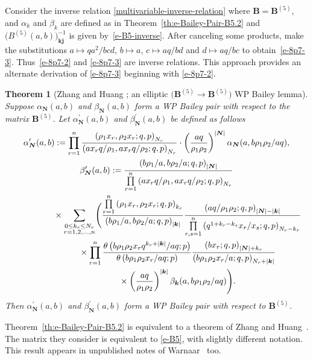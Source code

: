 \documentclass[pdftex]{sigma}
\numberwithin{equation}{section}
\newtheorem{Theorem}{Theorem}[section]
\newenvironment{Remark*}{\begin{remark*}\normalfont}{\end{remark*}}
\newcommand{\sumN}{{\left| \boldsymbol{N} \right|}}
\newcommand\sumk{{\left| \boldsymbol{k} \right|}}
\newcommand{\B}{{ \mathbf B}}
\newcommand{\N}{{ \boldsymbol N}}
\renewcommand{\k}{{ \boldsymbol{k}}}
\renewcommand{\j}{{ \boldsymbol{j}}}
\newcommand{\multsum}[3]{{\sum\limits_{\substack{{0\le #1_#3 \le #2_#3} \\
{#3 =1,2,\dots, n}}}}}
\newcommand{\sqprod}[1]{\prod\limits_{r, s =1}^{#1}} %
\newcommand{\smallprod}[1]{\prod\limits_{r =1}^{#1}} %
\newcommand{\xover}[1]{#1_{r}/#1_{s}}
\newcommand{\ellipticqrfac}[2]{{\left({#1}; q, p\right)_{#2}}} %
\newcommand{\elliptictheta}[1]{\theta \left({#1} ; p\right) }
\begin{document}
Consider the inverse relation \eqref{multivariable-inverse-relation} where $\B=\B^{(5)}$, and $\alpha_k$ and $\beta_k$ are defined as in Theorem~\ref{th:e-Bailey-Pair-B5.2} and $\big(B^{(5)}(a,b)\big)^{-1}_{\k\j} $ is given by~\eqref{e-B5-inverse}. After canceling some products, make the substitutions $a\mapsto qa^2/bcd$, $b\mapsto a$, $c\mapsto aq/bd$ and $d\mapsto aq/bc$ to obtain~\eqref{e-8p7-3}. Thus~\eqref{e-8p7-2} and \eqref{e-8p7-3} are inverse relations. This approach provides an alternate derivation of \eqref{e-8p7-3} beginning with \eqref{e-8p7-2}.

\begin{Theorem}[Zhang and Huang \cite{ZH-preprint}; an elliptic $\big(\B^{(5)} \to\B^{(5)}\big)$ WP Bailey lemma] \label{th:e-WP-BaileyLemma-B5-B5}
Suppose $\alpha_\N(a,b)$ and $\beta_\N(a,b)$ form a WP Bailey pair with respect to the matrix $\B^{(5)}$. Let ${\alpha}^{\prime}_\N(a,b)$ and ${\beta}^{\prime}_\N(a,b)$ be defined as follows
\begin{gather*}
{\alpha}^{\prime}_\N(a,b) :=
 \smallprod n \frac{ \ellipticqrfac{\rho_1x_r, \rho_2x_r}{N_r}}
{\ellipticqrfac{ax_rq/\rho_1, ax_rq/\rho_2}{N_r}}
\cdot \left(\frac{aq}{\rho_1\rho_2}\right)^{\sumN}
 \alpha_\N(a, b\rho_1\rho_2/aq),\\
{\beta}^{\prime}_\N (a,b) :=
\frac{\ellipticqrfac{b\rho_1/a, b\rho_2/a }{\sumN}}
{\smallprod n \ellipticqrfac{ax_rq/\rho_1, ax_rq/\rho_2}{N_r}}\\
\hphantom{{\beta}^{\prime}_\N (a,b) :=}{} \times \multsum{k}{N}{r} \Bigg( \frac{ \smallprod n \ellipticqrfac{\rho_1x_r, \rho_2x_r}{k_r}}
{\ellipticqrfac{b\rho_1/a, b\rho_2/a}{\sumk}}
\frac{\ellipticqrfac{aq/\rho_1\rho_2}{\sumN-\sumk} }
{\sqprod n \ellipticqrfac{q^{1+k_r-k_s}\xover x }{N_r-k_r}}\\
\hphantom{{\beta}^{\prime}_\N (a,b) :=}{} \times
\smallprod n \frac{\elliptictheta{ b\rho_1\rho_2x_rq^{k_r+\sumk}/{aq}}}{\elliptictheta{ b\rho_1\rho_2x_r/{aq}}}
\frac{\ellipticqrfac{bx_r}{\sumN+k_r}}{\ellipticqrfac{b\rho_1\rho_2x_r/a}{N_r+\sumk}} \notag\\
\hphantom{{\beta}^{\prime}_\N (a,b) :=}{} \times
\left(\frac{aq}{\rho_1\rho_2}\right)^{\sumk}
\beta_\k(a,b\rho_1\rho_2/aq) \Bigg).%
\end{gather*}
Then ${\alpha}^{\prime}_\N(a,b)$ and ${\beta}^{\prime}_\N(a,b)$ form a WP Bailey pair with respect to $\B^{(5)}$.
\end{Theorem}
\begin{Remark*} Theorem~\ref{th:e-Bailey-Pair-B5.2} is equivalent to a theorem of Zhang and Huang~\cite[Theorem~5.3]{ZH-preprint}. The matrix they consider is equivalent to \eqref{e-B5}, with slightly different notation. This result appears in unpublished notes of Warnaar~\cite{SOW-notes-2016} too.
\end{Remark*}
\end{document}
